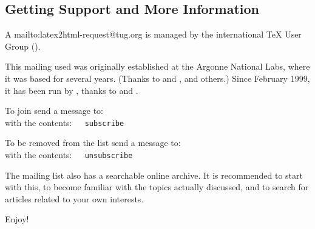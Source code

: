 \subsection[center]{Getting Support and More Information\label{support}}%
%

A %
{mailto:latex2html-request@tug.org}
is managed by the international \TeX{} User Group (\TUGurl).
 
This mailing used was originally established at the Argonne National Labs,
where it was based for several years.
(Thanks to \IanFoster{} and \BobOlson, and others.)
Since February 1999, it has been run by \TUGurl, thanks to
\ArtOgawa{} and \RossMoore.

\smallskip\noindent
To join send a message to: 
\\
with the contents:~~\texttt{ subscribe }


\smallskip\noindent
To be removed from the list send a message to: 
\\
with the contents:~~\texttt{ unsubscribe }


\bigskip\noindent
The mailing list also has a 
searchable online archive.
It is recommended to start with this, 
to become familiar with the topics actually discussed,
and to search for articles related to your own interests.

\bigskip
Enjoy!

